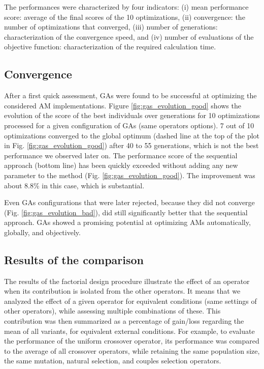 \documentclass{ametsoc}
\begin{document}
The performances were characterized by four indicators: (i) mean performance score: average of the final scores of the 10 optimizations, (ii) convergence: the number of optimizations that converged, (iii) number of generations: characterization of the convergence speed, and (iv) number of evaluations of the objective function: characterization of the required calculation time.


\subsection{Convergence}

After a first quick assessment, GAs were found to be successful at optimizing the considered AM implementations. Figure \ref{fig:gas_evolution_good} shows the evolution of the score of the best individuals over generations for 10 optimizations processed for a given configuration of GAs (same operators options). 7 out of 10 optimizations converged to the global optimum (dashed line at the top of the plot in Fig. \ref{fig:gas_evolution_good}) after 40 to 55 generations, which is not the best performance we observed later on. The performance score of the sequential approach (bottom line) has been quickly exceeded without adding any new parameter to the method (Fig. \ref{fig:gas_evolution_good}). The improvement was about 8.8\% in this case, which is substantial.

Even GAs configurations that were later rejected, because they did not converge (Fig. \ref{fig:gas_evolution_bad}), did still significantly better that the sequential approach. GAs showed a promising potential at optimizing AMs automatically, globally, and objectively.


\subsection{Results of the comparison}
\label{sec:assessment:results}

The results of the factorial design procedure illustrate the effect of an operator when its contribution is isolated from the other operators. It means that we analyzed the effect of a given operator for equivalent conditions (same settings of other operators), while assessing multiple combinations of these. This contribution was then summarized as a percentage of gain/loss regarding the mean of all variants, for equivalent external conditions. For example, to evaluate the performance of the uniform crossover operator, its performance was compared to the average of all crossover operators, while retaining the same population size, the same mutation, natural selection, and couples selection operators.
\end{document}
